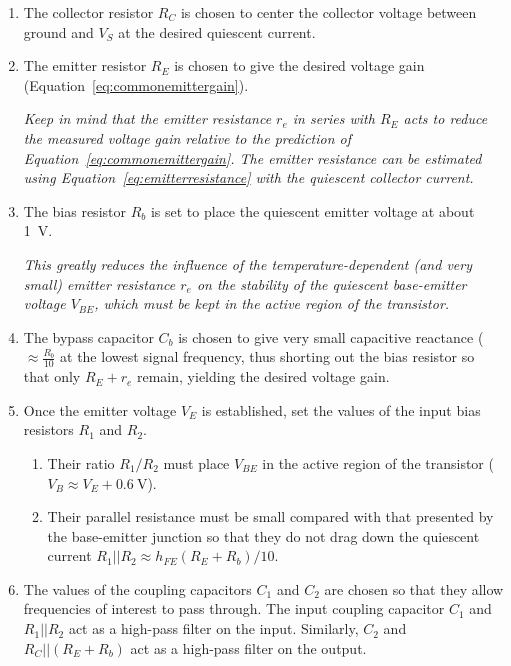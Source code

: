 \documentclass[11pt]{article}
\begin{document}
\begin{enumerate}
\item The collector resistor $R_C$ is chosen to center the collector
  voltage between ground and $V_S$ at the desired quiescent current.

\item The emitter resistor $R_E$ is chosen to give the desired voltage
  gain (Equation~\ref{eq:commonemittergain}).

  \emph{Keep in mind that the emitter resistance $r_e$ in series with
    $R_E$ acts to reduce the measured voltage gain relative to the
    prediction of Equation~\ref{eq:commonemittergain}. The emitter
    resistance can be estimated using
    Equation~\ref{eq:emitterresistance} with the quiescent collector
    current.}

\item The bias resistor $R_b$ is set to place the quiescent emitter
  voltage at about 1~V.

  \emph{This greatly reduces the influence of the
    temperature-dependent (and very small) emitter resistance $r_e$ on
    the stability of the quiescent base-emitter voltage $V_{BE}$,
    which must be kept in the active region of the transistor.}

\item The bypass capacitor $C_b$ is chosen to give very small
  capacitive reactance ($\approx \frac{R_b}{10}$ at the lowest signal 
  frequency, thus shorting out the bias resistor so that only $R_E +
  r_e$ remain, yielding the desired voltage gain.

\item Once the emitter voltage $V_E$ is established, set the values of
  the input bias resistors $R_1$ and $R_2$.
  \begin{enumerate}
  \item Their ratio $R_1/R_2$ must place $V_{BE}$ in the active region
    of the transistor ($V_B \approx V_E + 0.6~\mathrm{V}$).

  \item Their parallel resistance must be small compared with that
    presented by the base-emitter junction so that they do not drag 
    down the quiescent current
    $R_1 || R_2 \approx h_{FE} (R_E + R_b)/10$.
  \end{enumerate}

\item The values of the coupling capacitors $C_1$ and $C_2$ are chosen
  so that they allow frequencies of interest to pass through. The
  input coupling capacitor $C_1$ and $R_1||R_2$ act as a
  high-pass filter on the input. Similarly, $C_2$ and $R_C||(R_E +
  R_b)$ act as a high-pass filter on the output. 
\end{enumerate}
\end{document}

